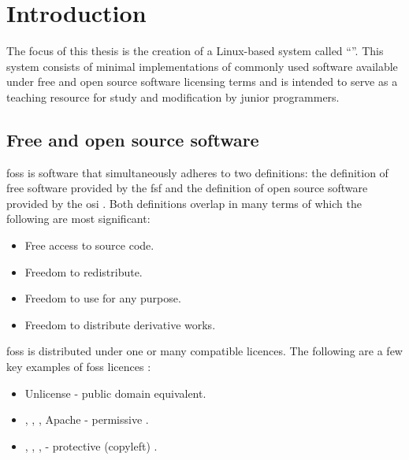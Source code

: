 \section{Introduction}\label{Introduction}

The focus of this thesis is the creation of a Linux-based system called \enquote{}\cite{lfl}. This system consists of minimal implementations of commonly used software available under free and open source software licensing terms and is intended to serve as a teaching resource for study and modification by junior programmers.

\subsection{Free and open source software}

\gls{foss} is software that simultaneously adheres to two definitions: the definition of free software \cite{fsf-free-software} provided by the \gls{fsf} \cite{fsf} and the definition of open source software \cite{osi-open-source} provided by the \gls{osi} \cite{osi}. Both definitions overlap in many terms of which the following are most significant:

\begin{itemize}
    \item Free access to source code.
    \item Freedom to redistribute.
    \item Freedom to use for any purpose.
    \item Freedom to distribute derivative works.
\end{itemize}

\gls{foss} is distributed under one or many compatible licences. The following are a few key examples of \gls{foss} licences \cite{spdx-licenses,fsf-licenses}:

\begin{itemize}
    \item Unlicense \cite{unlicense} - public domain \cite{public-domain} equivalent.
    \item {} \cite{mit},  \cite{bsd-2},  \cite{bsd-3}, Apache \cite{apache} - permissive \cite{osi-permissive}.
    \item {} \cite{mpl},  \cite{lgpl},  \cite{gpl},  \cite{agpl} - protective (copyleft) \cite{gnu-copyleft,eupl-copyleft}.
\end{itemize}

